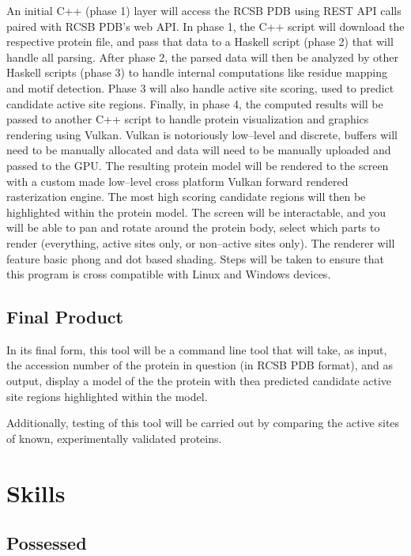 \documentclass[12pt]{article}
\begin{document}
		An initial C++ (phase 1) layer will access the RCSB PDB using REST API
		calls paired with RCSB PDB's web API. In phase 1, the C++ script will
		download the respective protein file, and pass that data to a Haskell
		script (phase 2) that will handle all parsing. After phase 2, the parsed
		data will then be analyzed by other Haskell scripts (phase 3) to handle
		internal computations like residue mapping and motif detection. Phase 3
		will also handle active site scoring, used to predict candidate active 
		site regions. Finally, in phase 4, the computed results will be passed
		to another C++ script to handle protein visualization and graphics 
		rendering using Vulkan. Vulkan is notoriously low--level and discrete,
		buffers will need to be manually allocated and data will need to be 
		manually uploaded and passed to the GPU. The resulting protein model will
		be rendered to the screen with a custom made low--level cross platform 
		Vulkan forward rendered rasterization engine. The most high scoring 
		candidate regions will then be highlighted within the protein model.
		The screen will be interactable, and you will be able to pan and rotate
		around the protein body, select which parts to render (everything,
		active sites only, or non--active sites only). The renderer will
		feature basic phong and dot based shading. Steps will be taken to ensure
		that this program is cross compatible with Linux and Windows devices.


		\subsection*{Final Product}

		In its final form, this tool will be a command line tool that will take,
		as input, the accession number of the protein in question (in RCSB PDB
		format), and as output, display a model of the the protein with thea
		predicted candidate active site regions highlighted within the model. 

		Additionally, testing of this tool will be carried out by comparing the
		active sites of known, experimentally validated proteins.

	\section*{Skills}

		\subsection*{Possessed}
\end{document}
